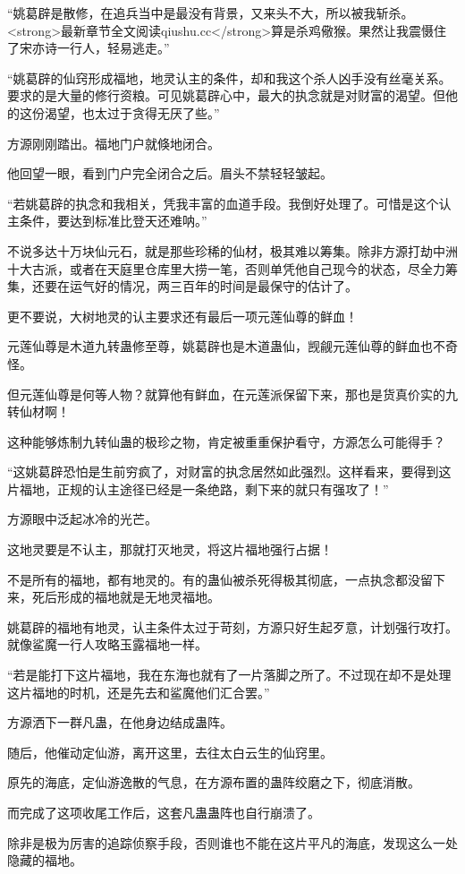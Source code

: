 \begin{this_body}
“姚葛辟是散修，在追兵当中是最没有背景，又来头不大，所以被我斩杀。<strong>最新章节全文阅读qiushu.cc</strong>算是杀鸡儆猴。果然让我震慑住了宋亦诗一行人，轻易逃走。”

“姚葛辟的仙窍形成福地，地灵认主的条件，却和我这个杀人凶手没有丝毫关系。要求的是大量的修行资粮。可见姚葛辟心中，最大的执念就是对财富的渴望。但他的这份渴望，也太过于贪得无厌了些。”

方源刚刚踏出。福地门户就倏地闭合。

他回望一眼，看到门户完全闭合之后。眉头不禁轻轻皱起。

“若姚葛辟的执念和我相关，凭我丰富的血道手段。我倒好处理了。可惜是这个认主条件，要达到标准比登天还难呐。”

不说多达十万块仙元石，就是那些珍稀的仙材，极其难以筹集。除非方源打劫中洲十大古派，或者在天庭里仓库里大捞一笔，否则单凭他自己现今的状态，尽全力筹集，还要在运气好的情况，两三百年的时间是最保守的估计了。

更不要说，大树地灵的认主要求还有最后一项元莲仙尊的鲜血！

元莲仙尊是木道九转蛊修至尊，姚葛辟也是木道蛊仙，觊觎元莲仙尊的鲜血也不奇怪。

但元莲仙尊是何等人物？就算他有鲜血，在元莲派保留下来，那也是货真价实的九转仙材啊！

这种能够炼制九转仙蛊的极珍之物，肯定被重重保护看守，方源怎么可能得手？

“这姚葛辟恐怕是生前穷疯了，对财富的执念居然如此强烈。这样看来，要得到这片福地，正规的认主途径已经是一条绝路，剩下来的就只有强攻了！”

方源眼中泛起冰冷的光芒。

这地灵要是不认主，那就打灭地灵，将这片福地强行占据！

不是所有的福地，都有地灵的。有的蛊仙被杀死得极其彻底，一点执念都没留下来，死后形成的福地就是无地灵福地。

姚葛辟的福地有地灵，认主条件太过于苛刻，方源只好生起歹意，计划强行攻打。就像鲨魔一行人攻略玉露福地一样。

“若是能打下这片福地，我在东海也就有了一片落脚之所了。不过现在却不是处理这片福地的时机，还是先去和鲨魔他们汇合罢。”

方源洒下一群凡蛊，在他身边结成蛊阵。

随后，他催动定仙游，离开这里，去往太白云生的仙窍里。

原先的海底，定仙游逸散的气息，在方源布置的蛊阵绞磨之下，彻底消散。

而完成了这项收尾工作后，这套凡蛊蛊阵也自行崩溃了。

除非是极为厉害的追踪侦察手段，否则谁也不能在这片平凡的海底，发现这么一处隐藏的福地。


\end{this_body}
